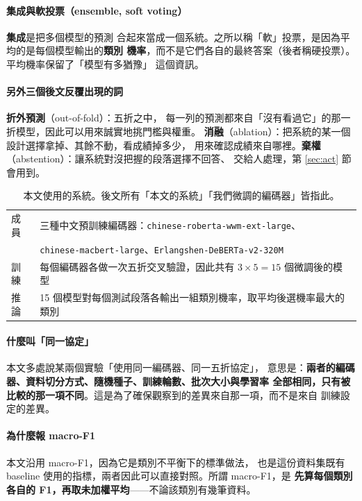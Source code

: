 \documentclass[11pt,a4paper]{ctexart}
\newcommand{\fn}[1]{\texttt{#1}}
\begin{document}
\paragraph{集成與軟投票（ensemble, soft voting）} \textbf{集成}是把多個模型的預測
合起來當成一個系統。之所以稱「軟」投票，是因為平均的是每個模型輸出的\textbf{類別
機率}，而不是它們各自的最終答案（後者稱硬投票）。平均機率保留了「模型有多猶豫」
這個資訊。

\paragraph{另外三個後文反覆出現的詞} \textbf{折外預測}（out-of-fold）：五折之中，
每一列的預測都來自「沒有看過它」的那一折模型，因此可以用來誠實地挑門檻與權重。
\textbf{消融}（ablation）：把系統的某一個設計選擇拿掉、其餘不動，看成績掉多少，
用來確認成績來自哪裡。\textbf{棄權}（abstention）：讓系統對沒把握的段落選擇不回答、
交給人處理，第 \ref{sec:act} 節會用到。

\begin{table}[h]
\centering\small
\begin{tabular}{@{}ll@{}}
\toprule
成員 & 三種中文預訓練編碼器：\fn{chinese-roberta-wwm-ext-large}、\\
     & \fn{chinese-macbert-large}、\fn{Erlangshen-DeBERTa-v2-320M} \\
訓練 & 每個編碼器各做一次五折交叉驗證，因此共有 $3 \times 5 = 15$ 個微調後的模型 \\
推論 & 15 個模型對每個測試段落各輸出一組類別機率，取平均後選機率最大的類別 \\
\bottomrule
\end{tabular}
\caption{本文使用的系統。後文所有「本文的系統」「我們微調的編碼器」皆指此。}
\end{table}

\paragraph{什麼叫「同一協定」} 本文多處說某兩個實驗「使用同一編碼器、同一五折協定」，
意思是：\textbf{兩者的編碼器、資料切分方式、隨機種子、訓練輪數、批次大小與學習率
全部相同，只有被比較的那一項不同}。這是為了確保觀察到的差異來自那一項，而不是來自
訓練設定的差異。

\paragraph{為什麼報 macro-F1} 本文沿用 macro-F1，因為它是類別不平衡下的標準做法，
也是這份資料集既有 baseline 使用的指標，兩者因此可以直接對照。所謂 macro-F1，是
\textbf{先算每個類別各自的 F1，再取未加權平均}——不論該類別有幾筆資料。
\end{document}
